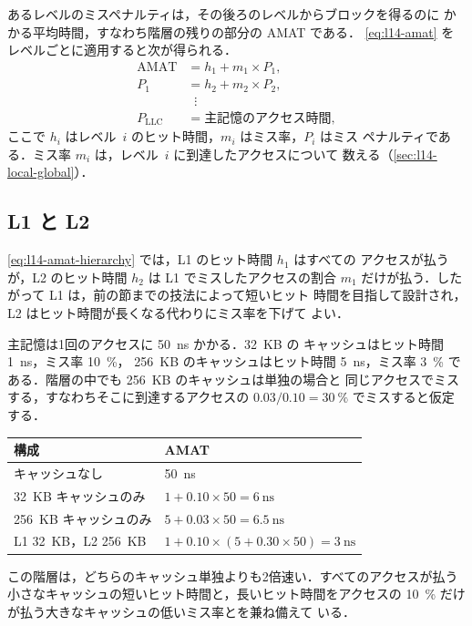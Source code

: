 \documentclass[../main.tex]{subfiles}
\begin{document}
あるレベルのミスペナルティは，その後ろのレベルからブロックを得るのに
かかる平均時間，すなわち階層の残りの部分の AMAT である．
\cref{eq:l14-amat} をレベルごとに適用すると次が得られる．
\begin{equation}
  \begin{aligned}
    \text{AMAT} &= h_1 + m_1 \times P_1 , \\
    P_1 &= h_2 + m_2 \times P_2 , \\
    &\;\;\vdots \\
    P_{\text{LLC}} &= \text{主記憶のアクセス時間},
  \end{aligned}
  \label{eq:l14-amat-hierarchy}
\end{equation}
ここで $h_i$ はレベル~$i$ のヒット時間，$m_i$ はミス率，$P_i$ はミス
ペナルティである．ミス率 $m_i$ は，レベル~$i$ に到達したアクセスについて
数える（\cref{sec:l14-local-global}）．

\subsection{L1 と L2}

\cref{eq:l14-amat-hierarchy} では，L1 のヒット時間 $h_1$ はすべての
アクセスが払うが，L2 のヒット時間 $h_2$ は L1 でミスしたアクセスの割合
$m_1$ だけが払う．したがって L1 は，前の節までの技法によって短いヒット
時間を目指して設計され，L2 はヒット時間が長くなる代わりにミス率を下げて
よい．

\begin{example}
  \label{ex:l14-hierarchy}
  主記憶は1回のアクセスに \SI{50}{\nano\second} かかる．32~KB の
  キャッシュはヒット時間 \SI{1}{\nano\second}，ミス率 \SI{10}{\percent}，
  256~KB のキャッシュはヒット時間 \SI{5}{\nano\second}，ミス率
  \SI{3}{\percent} である．階層の中でも 256~KB のキャッシュは単独の場合と
  同じアクセスでミスする，すなわちそこに到達するアクセスの
  $0.03/0.10 = \SI{30}{\percent}$ でミスすると仮定する．
  \begin{center}\small
    \begin{tabular}{@{}ll@{}}
      \toprule
      構成 & AMAT \\
      \midrule
      キャッシュなし                & \SI{50}{\nano\second} \\
      32~KB キャッシュのみ          & $1 + 0.10\times 50 = \SI{6}{\nano\second}$ \\
      256~KB キャッシュのみ         & $5 + 0.03\times 50 = \SI{6.5}{\nano\second}$ \\
      L1 32~KB，L2 256~KB           & $1 + 0.10\times(5 + 0.30\times 50) = \SI{3}{\nano\second}$ \\
      \bottomrule
    \end{tabular}
  \end{center}
  この階層は，どちらのキャッシュ単独よりも2倍速い．すべてのアクセスが払う
  小さなキャッシュの短いヒット時間と，長いヒット時間をアクセスの
  \SI{10}{\percent} だけが払う大きなキャッシュの低いミス率とを兼ね備えて
  いる．
\end{example}
\end{document}
